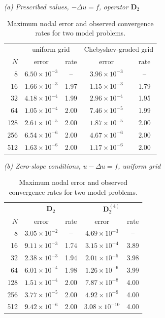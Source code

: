 \begin{table}[htbp]\centering\small
\caption{Maximum nodal error and observed convergence rates for two model problems.}
\textit{(a) Prescribed values, $-\Delta u=f$, operator $\mathbf D_2$}\\[2pt]
\begin{tabular}{r cc cc}
\toprule
& \multicolumn{2}{c}{uniform grid} & \multicolumn{2}{c}{Chebyshev-graded grid}\\
$N$ & error & rate & error & rate\\
\midrule
8 & $6.50{\times}10^{-3}$ & -- & $3.96{\times}10^{-3}$ & --\\
16 & $1.66{\times}10^{-3}$ & 1.97 & $1.15{\times}10^{-3}$ & 1.79\\
32 & $4.18{\times}10^{-4}$ & 1.99 & $2.96{\times}10^{-4}$ & 1.95\\
64 & $1.05{\times}10^{-4}$ & 2.00 & $7.46{\times}10^{-5}$ & 1.99\\
128 & $2.61{\times}10^{-5}$ & 2.00 & $1.87{\times}10^{-5}$ & 2.00\\
256 & $6.54{\times}10^{-6}$ & 2.00 & $4.67{\times}10^{-6}$ & 2.00\\
512 & $1.63{\times}10^{-6}$ & 2.00 & $1.17{\times}10^{-6}$ & 2.00\\
\bottomrule
\end{tabular}

\medskip
\textit{(b) Zero-slope conditions, $u-\Delta u=f$, uniform grid}\\[2pt]
\begin{tabular}{r cc cc}
\toprule
& \multicolumn{2}{c}{$\mathbf D_2$} & \multicolumn{2}{c}{$\mathbf D_2^{(4)}$}\\
$N$ & error & rate & error & rate\\
\midrule
8 & $3.05{\times}10^{-2}$ & -- & $4.69{\times}10^{-3}$ & --\\
16 & $9.11{\times}10^{-3}$ & 1.74 & $3.15{\times}10^{-4}$ & 3.89\\
32 & $2.38{\times}10^{-3}$ & 1.94 & $2.01{\times}10^{-5}$ & 3.98\\
64 & $6.01{\times}10^{-4}$ & 1.98 & $1.26{\times}10^{-6}$ & 3.99\\
128 & $1.51{\times}10^{-4}$ & 2.00 & $7.87{\times}10^{-8}$ & 4.00\\
256 & $3.77{\times}10^{-5}$ & 2.00 & $4.92{\times}10^{-9}$ & 4.00\\
512 & $9.42{\times}10^{-6}$ & 2.00 & $3.08{\times}10^{-10}$ & 4.00\\
\bottomrule
\end{tabular}
\end{table}

